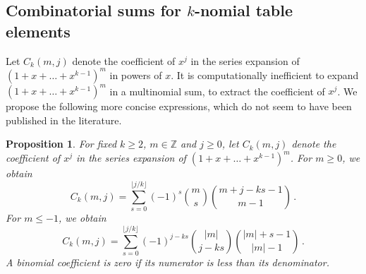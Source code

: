 \documentclass[review]{elsarticle}
\theoremstyle{plain}
\newtheorem{proposition}[theorem]{Proposition}
\begin{document}
\subsection{Combinatorial sums for $k$-nomial table elements}\label{sec:tbl_elem}
Let $C_k(m,j)$ denote the coefficient of $x^j$ in the series expansion of $(1+x+\dots+x^{k-1})^m$ in powers of $x$.
It is computationally inefficient to expand $(1+x+\dots+x^{k-1})^m$ in a multinomial sum, to extract the coefficient of $x^j$.
We propose the following more concise expressions, which do not seem to have been published in the literature.
\begin{proposition}
For fixed $k\ge2$, $m\in\mathbb{Z}$ and $j\ge0$,
let $C_k(m,j)$ denote the coefficient of $x^j$ in the series expansion of $(1+x+\dots+x^{k-1})^m$.
For $m\ge0$, we obtain
\begin{equation}
\label{eq:C_pos}
  C_k(m,j) = \sum_{s=0}^{\lfloor j/k \rfloor} (-1)^s\binom{m}{s}\binom{m+j-ks-1}{m-1} \,.
\end{equation}
For $m\le-1$, we obtain
\begin{equation}
\label{eq:C_neg}
C_k(m,j) = \sum_{s=0}^{\lfloor j/k \rfloor} (-1)^{j-ks} \binom{|m|}{j-ks} \binom{|m|+s-1}{|m|-1} \,.
\end{equation}
A binomial coefficient is zero if its numerator is less than its denominator.  
\end{proposition}
\end{document}

